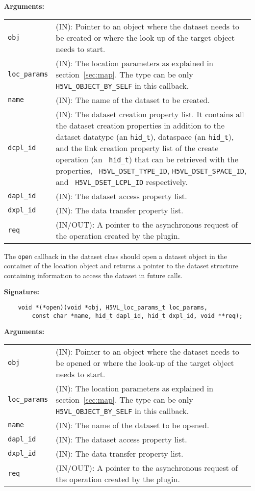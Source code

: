 \textbf{Arguments:}\\
\begin{tabular}{l p{10cm}}
  {\tt obj} & (IN): Pointer to an object where the dataset needs
  to be created or where the look-up of the target object needs to
  start.\\
  {\tt loc\_params} & (IN): The location parameters as explained in
  section~\ref{sec:map}. The type can be only {\tt
    H5VL\_OBJECT\_BY\_SELF} in this callback. \\
  {\tt name} & (IN): The name of the dataset to be created.\\
  {\tt dcpl\_id} & (IN): The dataset creation property list. It contains
  all the dataset creation properties in addition to the dataset
  datatype (an {\tt hid\_t}), dataspace (an {\tt hid\_t}), and the
  link creation property list of the create operation (an {\tt
    hid\_t}) that can be retrieved with the properties, {\tt
    H5VL\_DSET\_TYPE\_ID}, {\tt H5VL\_DSET\_SPACE\_ID},  and {\tt
    H5VL\_DSET\_LCPL\_ID} respectively.\\
  {\tt dapl\_id} & (IN): The dataset access property list.\\
  {\tt dxpl\_id} & (IN): The data transfer property list.\\
  {\tt req} & (IN/OUT): A pointer to the asynchronous request of the
  operation created by the plugin.\\
\end{tabular}

The {\tt open} callback in the dataset class should open a dataset
object in the container of the location object and returns a pointer
to the dataset structure containing information to access the dataset
in future calls.

\textbf{Signature:}
\begin{lstlisting}
    void *(*open)(void *obj, H5VL_loc_params_t loc_params, 
        const char *name, hid_t dapl_id, hid_t dxpl_id, void **req);
\end{lstlisting}

\textbf{Arguments:}\\
\begin{tabular}{l p{10cm}}
  {\tt obj} & (IN): Pointer to an object where the dataset needs to be
  opened or where the look-up of the target object needs to start.\\
  {\tt loc\_params} & (IN): The location parameters as explained in
  section~\ref{sec:map}. The type can be only {\tt
    H5VL\_OBJECT\_BY\_SELF} in this callback. \\
  {\tt name} & (IN): The name of the dataset to be opened.\\
  {\tt dapl\_id} & (IN): The dataset access property list.\\
  {\tt dxpl\_id} & (IN): The data transfer property list.\\
  {\tt req} & (IN/OUT): A pointer to the asynchronous request of the
  operation created by the plugin.\\
\end{tabular}

